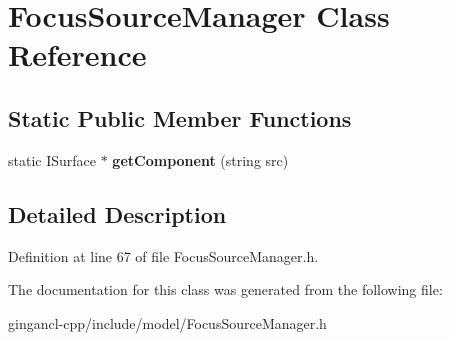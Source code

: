 \section{FocusSourceManager Class Reference}
\label{classbr_1_1pucrio_1_1telemidia_1_1ginga_1_1ncl_1_1model_1_1presentation_1_1focus_1_1FocusSourceManager}
\subsection*{Static Public Member Functions}
\begin{CompactItemize}
\item 
static ISurface $\ast$ \textbf{getComponent} (string src)\label{classbr_1_1pucrio_1_1telemidia_1_1ginga_1_1ncl_1_1model_1_1presentation_1_1focus_1_1FocusSourceManager_94eab7910258c56f07068268f7fd79b3}

\end{CompactItemize}


\subsection{Detailed Description}




Definition at line 67 of file FocusSourceManager.h.

The documentation for this class was generated from the following file:\begin{CompactItemize}
\item 
gingancl-cpp/include/model/FocusSourceManager.h\end{CompactItemize}
